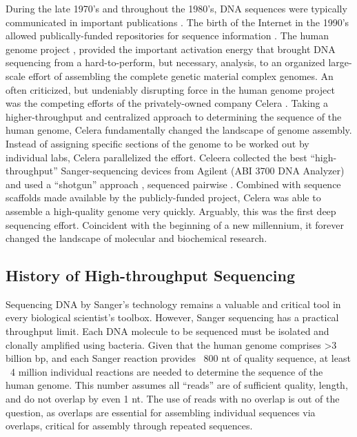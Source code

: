     During the late 1970’s and throughout the 1980’s, DNA sequences were typically communicated in important publications \citep{Cordell1980a,Sanger1978a}. The birth of the Internet in the 1990’s allowed publically-funded repositories for sequence information \citep{Benson2011a}. The human genome project \citep{Lander2011a,Venter2001}, provided the important activation energy that brought DNA sequencing from a hard-to-perform, but necessary, analysis, to an organized large-scale effort of assembling the complete genetic material complex genomes. An often criticized, but undeniably disrupting force in the human genome project was the competing efforts of the privately-owned company Celera \citep{Venter2008a}. Taking a higher-throughput and centralized approach to determining the sequence of the human genome, Celera fundamentally changed the landscape of genome assembly. Instead of assigning specific sections of the genome to be worked out by individual labs, Celera parallelized the effort. Celeera collected the best ``high-throughput'' Sanger-sequencing devices from Agilent (ABI 3700 DNA Analyzer) and used a ``shotgun'' approach \citep{Staden1979}, sequenced pairwise \citep{Roach1995}. Combined with sequence scaffolds made available by the publicly-funded project, Celera was able to assemble a high-quality genome very quickly. Arguably, this was the first deep sequencing effort. Coincident with the beginning of a new millennium, it forever changed the landscape of molecular and biochemical research.

  \subsection{History of High-throughput Sequencing}\label{Intro:subsec: History of HTS}

    Sequencing DNA by Sanger’s technology remains a valuable and critical tool in every biological scientist’s toolbox. However, Sanger sequencing has  a practical throughput limit. Each DNA molecule to be sequenced must be isolated and clonally amplified using bacteria. Given that the human genome \citep{Hattori2005a} comprises >3 billion bp, and each Sanger reaction provides ~800 nt of quality sequence, at least ~4 million individual reactions are needed to determine the sequence of the human genome. This number assumes all ``reads'' are of sufficient quality, length, and do not overlap by even 1 nt. The use of reads with no overlap is out of the question, as overlaps are essential for assembling individual sequences via overlaps, critical for assembly through repeated sequences. 

